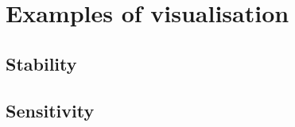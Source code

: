 \documentclass[a4paper,12pt]{report}
\begin{document}



\appendix
{}
\chapter{Examples of visualisation}

\section{Stability}
\section{Sensitivity}

\end{document}
